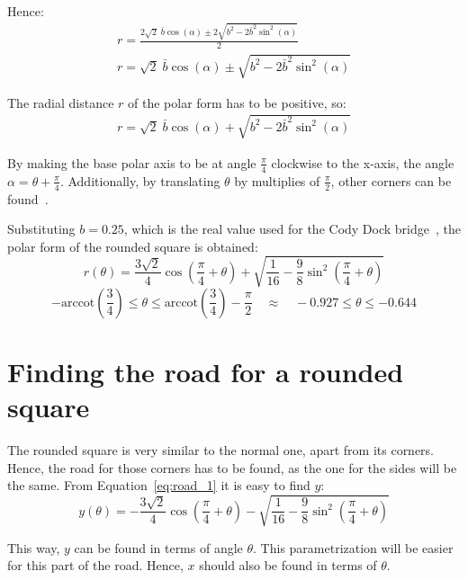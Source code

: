 \documentclass[12pt]{article}
\begin{document}
        Hence:
        \begin{align}
            r = \frac{2 \sqrt{2}\;\bar{b} \cos(\alpha) \pm 2 \sqrt{b^2 - 2\bar{b}^2 \sin^2(\alpha)}}{2} \\
            r = \sqrt{2}\;\bar{b} \cos(\alpha) \pm \sqrt{b^2 - 2\bar{b}^2 \sin^2(\alpha)}
        \end{align}

        The radial distance $r$ of the polar form has to be positive, so:
        \begin{align}
            r = \sqrt{2}\;\bar{b} \cos(\alpha) + \sqrt{b^2 - 2\bar{b}^2 \sin^2(\alpha)}
        \end{align}

        By making the base polar axis to be at angle $\frac{\pi}{4}$ clockwise to the x-axis, the angle $\alpha = \theta + \frac{\pi}{4}$. Additionally, by translating $\theta$ by multiplies of $\frac{\pi}{2}$, other corners can be found~\cite{bridge_wolfram}.

        Substituting $b=0.25$, which is the real value used for the Cody Dock bridge~\cite{bridge_wolfram}, the polar form of the rounded square is obtained:
        \begin{equation}
            r(\theta) = \frac{3\sqrt{2}}{4} \cos (\frac{\pi}{4} + \theta) + \sqrt{\frac{1}{16} - \frac{9}{8} \sin^2 (\frac{\pi}{4}+\theta)}
        \end{equation}
        \[- \text{arccot}(\frac{3}{4}) \leq \theta \leq \text{arccot}(\frac{3}{4}) - \frac{\pi}{2} \quad \approx \quad -0.927 \leq \theta \leq -0.644\]

    \section{Finding the road for a rounded square}

        The rounded square is very similar to the normal one, apart from its corners. Hence, the road for those corners has to be found, as the one for the sides will be the same. From Equation~\ref{eq:road_1} it is easy to find $y$:
        \begin{equation}\label{eq:rounded_ytheta}
            y(\theta) = - \frac{3\sqrt{2}}{4} \cos (\frac{\pi}{4} + \theta) - \sqrt{\frac{1}{16} - \frac{9}{8} \sin^2 (\frac{\pi}{4}+\theta)}
        \end{equation}

        This way, $y$ can be found in terms of angle $\theta$. This parametrization will be easier for this part of the road. Hence, $x$ should also be found in terms of $\theta$.
\end{document}
